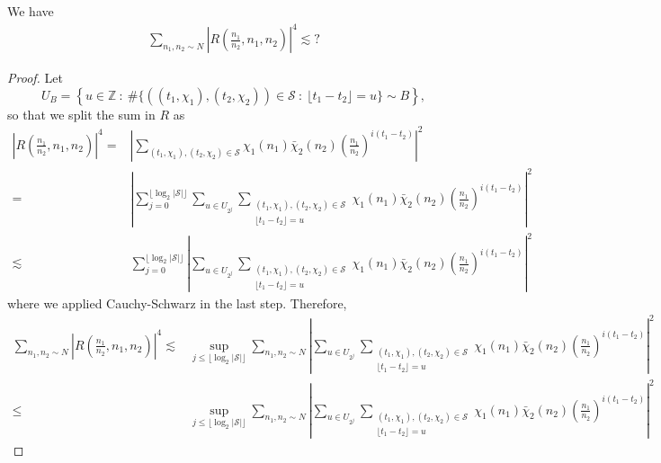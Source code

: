 \begin{lemma}
    We have \begin{align*}
        \sum_{n_1,n_2\sim N}\left|R\left(\frac{n_1}{n_2},n_1,n_2\right) \right|^4\lesssim ?
    \end{align*}
\end{lemma}
\begin{proof}
    Let \[
    U_B=\left\{u\in\mathbb{Z} \ : \ \#\{((t_1,\chi_1),(t_2,\chi_2))\in \mathcal{S} \ : \ \lfloor {t_1-t_2}\rfloor = u \} \sim B \right\},
    \]
    so that we split the sum in $R$ as \begin{align*}
        \left|R\left(\frac{n_1}{n_2} ,n_1,n_2\right) \right|^4 =&
        \left|
        \sum_{(t_1,\chi_1),(t_2,\chi_2)\in \mathcal{S}}
        \chi_1(n_1)\bar{\chi}_2(n_2) \left(\frac{n_1}{n_2}\right)^{i(t_1-t_2)}\right|^2 \\
        =& \left|
        \sum_{j=0}^{ \lfloor \log_2 |\mathcal{S}|\rfloor} \sum_{u\in U_{2^j}}\sum_{\substack{(t_1,\chi_1),(t_2,\chi_2)\in \mathcal{S}\\ \lfloor t_1-t_2 \rfloor = u}} 
        \chi_1(n_1)\bar{\chi}_2(n_2) \left(\frac{n_1}{n_2}\right)^{i(t_1-t_2)}\right|^2\\
        \lesssim& \sum_{j=0}^{ \lfloor \log_2 |\mathcal{S}|\rfloor} \left|
         \sum_{u\in U_{2^j}}\sum_{\substack{(t_1,\chi_1),(t_2,\chi_2)\in \mathcal{S}\\ \lfloor t_1-t_2 \rfloor = u}} 
        \chi_1(n_1)\bar{\chi}_2(n_2) \left(\frac{n_1}{n_2}\right)^{i(t_1-t_2)}\right|^2
    \end{align*}
    where we applied Cauchy-Schwarz in the last step.
    Therefore, \begin{align*}
        \sum_{n_1,n_2\sim N}\left|R\left(\frac{n_1}{n_2},n_1,n_2\right) \right|^4 \lesssim & 
        \sup_{j\leq \lfloor \log_2 |\mathcal{S}|\rfloor} \sum_{n_1,n_2\sim N} \left|
        \sum_{u\in U_{2^j}}\sum_{\substack{(t_1,\chi_1),(t_2,\chi_2)\in \mathcal{S}\\ \lfloor t_1-t_2 \rfloor = u}} 
       \chi_1(n_1)\bar{\chi}_2(n_2) \left(\frac{n_1}{n_2}\right)^{i(t_1-t_2)}\right|^2\\
       \leq& \sup_{j\leq \lfloor \log_2 |\mathcal{S}|\rfloor} \sum_{n_1,n_2\sim N} \left|
       \sum_{u\in U_{2^j}}\sum_{\substack{(t_1,\chi_1),(t_2,\chi_2)\in \mathcal{S}\\ \lfloor t_1-t_2 \rfloor = u}} 
      \chi_1(n_1)\bar{\chi}_2(n_2) \left(\frac{n_1}{n_2}\right)^{i(t_1-t_2)}\right|^2
    \end{align*}
\end{proof}